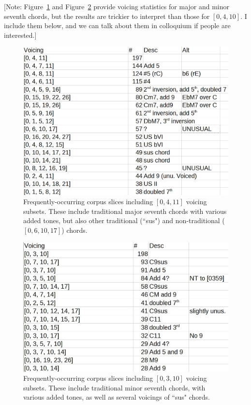  



[Note: Figure~\ref{[0,4,11]} and Figure~\ref{[0,3,10]} provide voicing statistics for major and minor seventh chords, but the results are trickier to interpret than those for $[0,4,10]$.  I include them below, and we can talk about them in colloquium if people are interested.]

\begin{figure}[h!]
	\centering
	\includegraphics[width=5in]{0411_tones.jpg}
	\caption{Frequently-occurring corpus slices including $[0,4,11]$ voicing subsets.  These include traditional major seventh chords with various added tones, but also other traditional (``sus") and non-traditional ($[0,6,10,17]$) chords.}
	\label{[0,4,11]}
\end{figure}

\begin{figure}[h!]
	\centering
	\includegraphics[width=5in]{0310_tones.jpg}
	\caption{Frequently-occurring corpus slices including $[0,3,10]$ voicing subsets.  These include traditional minor seventh chords, with various added tones, as well as several voicings of ``sus" chords.}
	\label{[0,3,10]}
\end{figure}
\newpage




